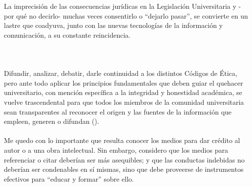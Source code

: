 \documentclass[a4paper]{article} %
\begin{document}
    La imprecisión de las consecuencias jurídicas en la Legislación Universitaria y -por qué no decirlo- muchas veces consentirlo o “dejarlo pasar”, se convierte en un lastre que coadyuva, junto con las nuevas tecnologías de la información y comunicación, a su constante reincidencia. \\ \\ \\ \\
    Difundir, analizar, debatir, darle continuidad a los distintos Códigos de Ética, pero ante todo aplicar los principios fundamentales que deben guiar el quehacer universitario, con mención específica a la integridad y honestidad académica, se vuelve trascendental  para que todos los miembros de la comunidad universitaria sean transparentes al reconocer el origen y las fuentes de la información que empleen, generen o difundan (\cite{plagioyetica}). \\ \\
    Me quedo con lo importante que resulta conocer los medios  para  dar  crédito  al autor o a una obra intelectual. Sin embargo, considero que los medios para referenciar o citar deberían ser más asequibles; y que las conductas indebidas no deberían ser condenables en sí mismas, sino que debe proveerse de instrumentos efectivos para “educar y formar” sobre ello.
    
\end{document}
